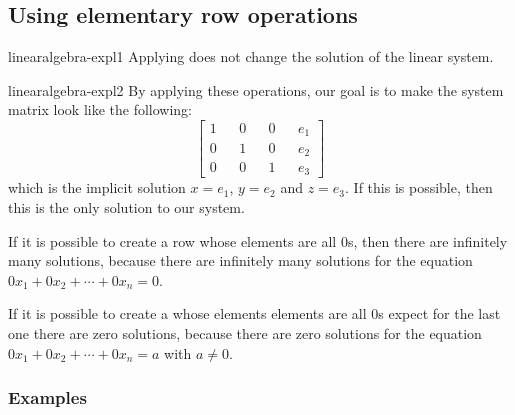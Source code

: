 \documentclass[preview]{standalone}
\begin{document}
\subsection{Using elementary row operations}

\begin{snippet}{linearalgebra-expl1}
Applying 
does not change the solution of the linear system.
\end{snippet}


\begin{snippet}{linearalgebra-expl2}
By applying these operations, our goal is to make the system matrix
look like the following:
\[
    \begin{bmatrix} 
        1 && 0 && 0 && e_1 \\
        0 && 1 && 0 && e_2 \\
        0 && 0 && 1 && e_3
    \end{bmatrix}
\]
which is the implicit solution
\(x=e_1\), \(y=e_2\) and \(z=e_3\).
If this is possible, then this is the only solution to our system.

\vspace{.25cm}

If it is possible to create a row whose elements are all \(0\)s,
then there are infinitely many solutions, because
there are infinitely many solutions for the equation
\(0x_1+0x_2+\cdots+0x_n = 0\).

\vspace{.25cm}

If it is possible to create a whose elements elements
are all \(0\)s expect for the last one there are zero solutions,
because there are zero solutions for the equation
\(0x_1+0x_2+\cdots+0x_n = a\) with \(a \neq 0\).
\end{snippet}

\subsubsection{Examples}



\end{document}
